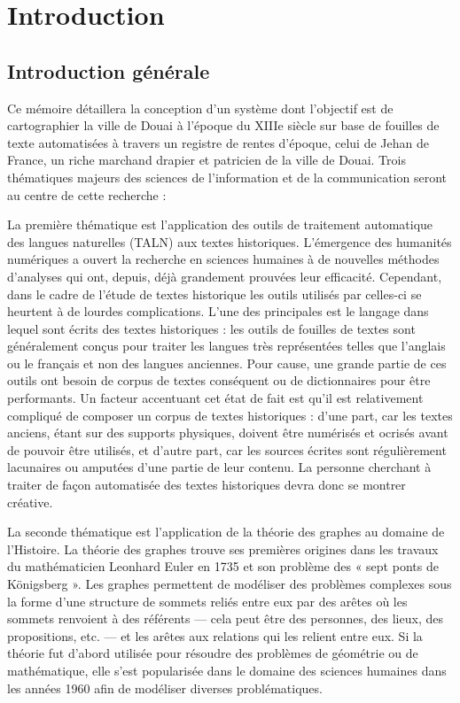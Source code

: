 \chapter{Introduction}
\section{Introduction générale}
 Ce mémoire détaillera la conception d’un système dont l’objectif est de cartographier la ville de Douai à l’époque du XIIIe siècle sur base de fouilles de texte automatisées à travers un registre de rentes d'époque, celui de Jehan de France, un riche marchand drapier et patricien de la ville de Douai. Trois thématiques majeurs des sciences de l'information et de la communication seront au centre de cette recherche :
 
 La première thématique est l’application des outils de traitement automatique des langues naturelles (TALN) aux textes historiques. L’émergence des humanités numériques a ouvert la recherche en sciences humaines à de nouvelles méthodes d’analyses qui ont, depuis, déjà grandement prouvées leur efficacité. Cependant, dans le cadre de l’étude de textes historique les outils utilisés par celles-ci se heurtent à de lourdes complications. L’une des principales est le langage dans lequel sont écrits des textes historiques : les outils de fouilles de textes sont généralement conçus pour traiter les langues très représentées telles que l’anglais ou le français et non des langues anciennes. Pour cause, une grande partie de ces outils ont besoin de corpus de textes conséquent ou de dictionnaires pour être performants. Un facteur accentuant cet état de fait est qu’il est relativement compliqué de composer un corpus de textes historiques : d’une part, car les textes anciens, étant sur des supports physiques, doivent être numérisés et ocrisés avant de pouvoir être utilisés, et d’autre part, car les sources écrites sont régulièrement lacunaires ou amputées d’une partie de leur contenu. La personne cherchant à traiter de façon automatisée des textes historiques devra donc se montrer créative.
 
La seconde thématique est l’application de la théorie des graphes au domaine de l’Histoire. La théorie des graphes trouve ses premières origines dans les travaux du mathématicien Leonhard Euler en 1735 et son problème des « sept ponts de Königsberg ». Les graphes permettent de modéliser des problèmes complexes sous la forme d’une structure de sommets reliés entre eux par des arêtes où les sommets renvoient à des référents — cela peut être des personnes, des lieux, des propositions, etc. — et les arêtes aux relations qui les relient entre eux. Si la théorie fut d’abord utilisée pour résoudre des problèmes de géométrie ou de mathématique, elle s’est popularisée dans le domaine des sciences humaines dans les années 1960 afin de modéliser diverses problématiques.

